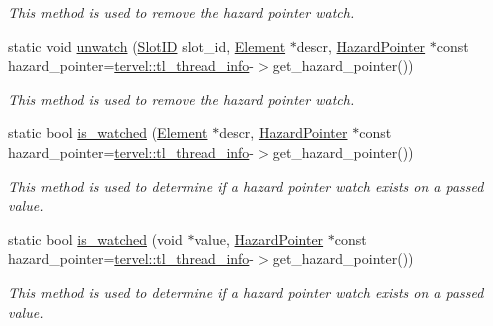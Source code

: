 \begin{DoxyCompactItemize}
\begin{DoxyCompactList}\small\item\em This method is used to remove the hazard pointer watch. \end{DoxyCompactList}\item 
static void \hyperlink{classtervel_1_1util_1_1memory_1_1hp_1_1_hazard_pointer_afc0d806a9da778508e03841a8cf3f680}{unwatch} (\hyperlink{classtervel_1_1util_1_1memory_1_1hp_1_1_hazard_pointer_a390f6869150121a40b300b955198b897}{Slot\+I\+D} slot\+\_\+id, \hyperlink{classtervel_1_1util_1_1memory_1_1hp_1_1_element}{Element} $\ast$descr, \hyperlink{classtervel_1_1util_1_1memory_1_1hp_1_1_hazard_pointer}{Hazard\+Pointer} $\ast$const hazard\+\_\+pointer=\hyperlink{namespacetervel_a60b23602adbb2dee6160af411b74bfd3}{tervel\+::tl\+\_\+thread\+\_\+info}-\/$>$get\+\_\+hazard\+\_\+pointer())
\begin{DoxyCompactList}\small\item\em This method is used to remove the hazard pointer watch. \end{DoxyCompactList}\item 
static bool \hyperlink{classtervel_1_1util_1_1memory_1_1hp_1_1_hazard_pointer_a925098130bd0c94a05c5481b98a6c80e}{is\+\_\+watched} (\hyperlink{classtervel_1_1util_1_1memory_1_1hp_1_1_element}{Element} $\ast$descr, \hyperlink{classtervel_1_1util_1_1memory_1_1hp_1_1_hazard_pointer}{Hazard\+Pointer} $\ast$const hazard\+\_\+pointer=\hyperlink{namespacetervel_a60b23602adbb2dee6160af411b74bfd3}{tervel\+::tl\+\_\+thread\+\_\+info}-\/$>$get\+\_\+hazard\+\_\+pointer())
\begin{DoxyCompactList}\small\item\em This method is used to determine if a hazard pointer watch exists on a passed value. \end{DoxyCompactList}\item 
static bool \hyperlink{classtervel_1_1util_1_1memory_1_1hp_1_1_hazard_pointer_ad168bf73b08b1cbdb5bff69f0e289433}{is\+\_\+watched} (void $\ast$value, \hyperlink{classtervel_1_1util_1_1memory_1_1hp_1_1_hazard_pointer}{Hazard\+Pointer} $\ast$const hazard\+\_\+pointer=\hyperlink{namespacetervel_a60b23602adbb2dee6160af411b74bfd3}{tervel\+::tl\+\_\+thread\+\_\+info}-\/$>$get\+\_\+hazard\+\_\+pointer())
\begin{DoxyCompactList}\small\item\em This method is used to determine if a hazard pointer watch exists on a passed value. \end{DoxyCompactList}\end{DoxyCompactItemize}
